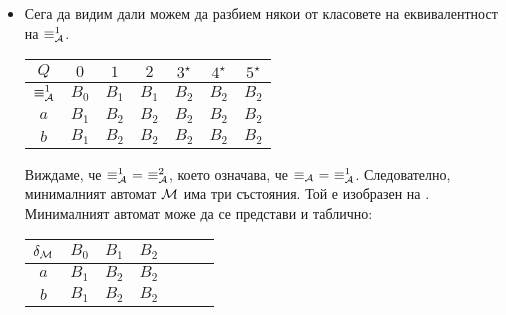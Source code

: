 \begin{extra2}
\begin{example}
\begin{itemize}
    \begin{tabular}{|c|c|c|c|c|c|c|}
      \hline
      $Q$ & $0$ & $1$ & $2$ & $3^\star$ & $4^\star$ & $5^\star$ \\
      \hline
      \hline
      $\equiv^0_\A$ & $A_0$ & $A_0$ & $A_0$ & $A_1$ & $A_1$ & $A_1$\\
      \hline
      $a$ & $A_0$& $A_1$ & $A_1$ & $A_1$ & $A_1$ & $A_1$\\
      \hline
      $b$ & $A_0$& $A_1$ & $A_1$ & $A_1$ & $A_1$ & $A_1$\\
      \hline
    \end{tabular}
    
    Виждаме, че $0 \not\equiv^1_\A 1$ и $1 \equiv^1_\A 2$.
    Класовете на еквивалентност на $\equiv^1_\A$ са следните множества:
    \begin{align*}
      & B_0 = \{0\},\\
      & B_1 = \{1,2\},\\
      & B_2 = \{3,4,5\}.
    \end{align*}
  \item
    Сега да видим дали можем да разбием някои от класовете на еквивалентност на $\equiv^1_\A$.
    
    \begin{tabular}{|c|c|c|c|c|c|c|}
      \hline
      $Q$ & $0$ & $1$ & $2$ & $3^\star$ & $4^\star$ & $5^\star$ \\
      \hline
      \hline
      $\equiv^1_\A$ & $B_0$ & $B_1$ & $B_1$ & $B_2$ & $B_2$ & $B_2$\\
      \hline
      $a$ & $B_1$ & $B_2$ & $B_2$ & $B_2$ & $B_2$ & $B_2$\\
      \hline
      $b$ & $B_1$ & $B_2$ & $B_2$ & $B_2$ & $B_2$ & $B_2$\\
      \hline
    \end{tabular}
    
    Виждаме, че $\equiv^1_\A\ =\ \equiv^2_\A$,
    което означава, че $\equiv_{\mathcal{A}}\ =\ \equiv^1_{\mathcal{A}}$.
    Следователно, минималният автомат $\mathcal{M}$ има три състояния.
    Той е изобразен на .  
    Минималният автомат може да се представи и таблично:
  
    \begin{tabular}{|c|c|c|c|c|c|c|}
      \hline
      $\delta_{\mathcal{M}}$ & $B_0$ & $B_1$ & $B_2$ \\
      \hline
      $a$ & $B_1$ & $B_2$ & $B_2$ \\
      \hline
      $b$ & $B_1$ & $B_2$ & $B_2$ \\
      \hline
    \end{tabular}
  \end{itemize}
  

\end{example}
\end{extra2}
